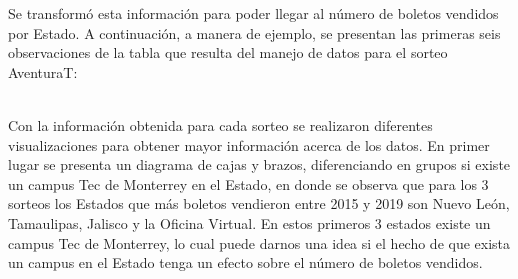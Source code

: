 Se transformó esta información para poder llegar al número de boletos vendidos por Estado. A continuación, a manera de ejemplo, se presentan las primeras seis observaciones de la tabla que resulta del manejo de datos para el sorteo AventuraT:

\begin{table}[H]
\caption{Datos para el sorteo AventuraT}
\label{aven}
\centering
{}

\end{table} \\

Con la información obtenida para cada sorteo se realizaron diferentes visualizaciones para obtener mayor información acerca de los datos. En primer lugar se presenta un diagrama de cajas y brazos, diferenciando en grupos si existe un campus Tec de Monterrey en el Estado, en donde se observa que para los 3 sorteos los Estados que más boletos vendieron entre 2015 y 2019 son Nuevo León, Tamaulipas, Jalisco y la Oficina Virtual. En estos primeros 3 estados existe un campus Tec de Monterrey, lo cual puede darnos una idea si el hecho de que exista un campus en el Estado tenga un efecto sobre el número de boletos vendidos.

